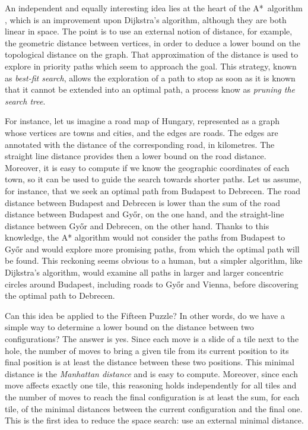 \documentclass[11pt,a4paper]{article}
\begin{document}
An independent and equally interesting idea lies at the heart of the
A*~algorithm \citep{hart-68,hart-72}, which is an improvement upon
Dijkstra's algorithm, although they are both linear in space. The
point is to use an external notion of distance, for example, the
geometric distance between vertices, in order to deduce a lower bound
on the topological distance on the graph. That approximation of the
distance is used to explore in priority paths which seem to approach
the goal. This strategy, known as \emph{best\hyp{}fit search}, allows
the exploration of a path to stop as soon as it is known that it
cannot be extended into an optimal path, a process know as
\emph{pruning the search tree}.

For instance, let us imagine a road map of Hungary, represented as a
graph whose vertices are towns and cities, and the edges are
roads. The edges are annotated with the distance of the corresponding
road, in kilometres. The straight line distance provides then a lower
bound on the road distance. Moreover, it is easy to compute if we know
the geographic coordinates of each town, so it can be used to guide
the search towards shorter paths. Let us assume, for instance, that we
seek an optimal path from Budapest to Debrecen. The road distance
between Budapest and Debrecen is lower than the sum of the road
distance between Budapest and Gy\H{o}r, on the one hand, and the
straight\hyp{}line distance between Gy\H{o}r and Debrecen, on the
other hand. Thanks to this knowledge, the A* algorithm would not
consider the paths from Budapest to Gy\H{o}r and would explore more
promising paths, from which the optimal path will be found. This
reckoning seems obvious to a human, but a simpler algorithm, like
Dijkstra's algorithm, would examine all paths in larger and larger
concentric circles around Budapest, including roads to Gy\H{o}r and
Vienna, before discovering the optimal path to Debrecen.

Can this idea be applied to the Fifteen Puzzle? In other words, do we
have a simple way to determine a lower bound on the distance between
two configurations? The answer is yes. Since each move is a slide of a
tile next to the hole, the number of moves to bring a given tile from
its current position to its final position is at least the distance
between these two positions. This minimal distance is the
\emph{Manhattan distance} and is easy to compute. Moreover, since each
move affects exactly one tile, this reasoning holds independently for
all tiles and the number of moves to reach the final configuration is
at least the sum, for each tile, of the minimal distances between the
current configuration and the final one. This is the first idea to
reduce the space search: use an external minimal distance.
\end{document}
